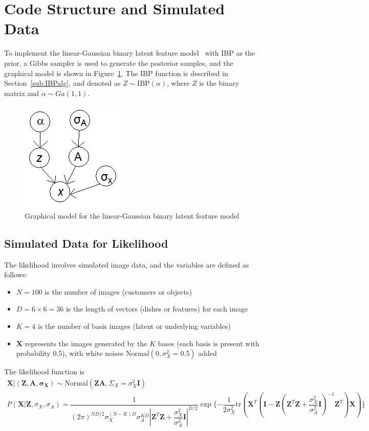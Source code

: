\section{Code Structure and Simulated Data}
To implement the linear-Gaussian binary latent feature model~\cite{griffiths2005infinite, ibp2012matlab} with IBP as the prior, a Gibbs sampler is used to generate the posterior samples, and the graphical model is shown in Figure~\ref{fig:IBPgeneration}. The IBP function is described in Section~\ref{sub:IBPalg}, and denoted as $Z \sim \text{IBP}(\alpha)$, where $Z$ is the binary matrix and $\alpha \sim Ga(1,1)$.

\begin{figure}
\centering
\includegraphics[width=0.25\linewidth]{IBP_generation.png}
\caption {Graphical model for the linear-Gaussian binary latent feature model}
\label{fig:IBPgeneration}
\end{figure}

\subsection{Simulated Data for Likelihood}

The likelihood involves simulated image data, and the variables are defined as follows:

\begin{itemize}
\item $N = 100$ is the number of images (customers or objects)
\item $D = 6 \times 6 = 36$ is the length of vectors (dishes or features) for each image
\item $K = 4$ is the number of basis images (latent or underlying variables)
\item $\mathbf{X}$ represents the images generated by the $K$ bases (each basis is present with probability 0.5), with white noises $\text{Normal}(0,\sigma_X^2 = 0.5)$ added
\end{itemize}

The likelihood function is
\begin{gather}
\mathbf{X}|(\mathbf{Z},\mathbf{A},\mathbf{\sigma_X}) \sim \text{Normal}(\mathbf{ZA},\Sigma_X = \sigma_X^2\mathbf{I}) \\
P(\mathbf{X} | \mathbf{Z}, \sigma_X, \sigma_A) = \dfrac{1}{(2\pi)^{ND/2} \sigma_X^{(N-K)D} \sigma_A^{KD} |\mathbf{Z}^T\mathbf{Z} + \dfrac{\sigma_X^2}{\sigma_A^2}\mathbf{I}|^{D/2}} \exp\{-\dfrac{1}{2\sigma^2_X} \text{tr}(\mathbf{X}^T(\mathbf{I}-\mathbf{Z}(\mathbf{Z}^T\mathbf{Z}+\dfrac{\sigma_X^2}{\sigma_A^2}\mathbf{I})^{-1}\mathbf{Z}^T)\mathbf{X})\}
\end{gather}

